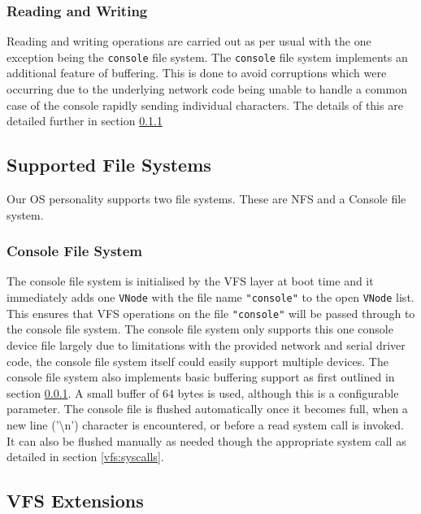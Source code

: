 \documentclass[12pt,english]{article}
\begin{document}
\subsubsection{Reading and Writing} \label{vfs:read_write}

Reading and writing operations are carried out as per usual with the one exception being the \texttt{console} file system. The \texttt{console} file system implements an additional feature of buffering. This is done to avoid corruptions which were occurring due to the underlying network code being unable to handle a common case of the console rapidly sending individual characters. The details of this are detailed further in section \ref{vfs:console}

\subsection{Supported File Systems} \label{vfs:filesystems}

Our OS personality supports two file systems. These are NFS and a Console file system.

\subsubsection{Console File System} \label{vfs:console}

The console file system is initialised by the VFS layer at boot time and it immediately adds one \texttt{VNode} with the file name \texttt{"console"} to the open \texttt{VNode} list. This ensures that VFS operations on the file \texttt{"console"} will be passed through to the console file system. The console file system only supports this one console device file largely due to limitations with the provided network and serial driver code, the console file system itself could easily support multiple devices. The console file system also implements basic buffering support as first outlined in section \ref{vfs:read_write}. A small buffer of 64 bytes is used, although this is a configurable parameter. The console file is flushed automatically once it becomes full, when a new line ('\textbackslash n') character is encountered, or before a read system call is invoked. It can also be flushed manually as needed though the appropriate system call as detailed in section \ref{vfs:syscalls}.

\subsection{VFS Extensions} \label{vfs:extensions}
\end{document}

